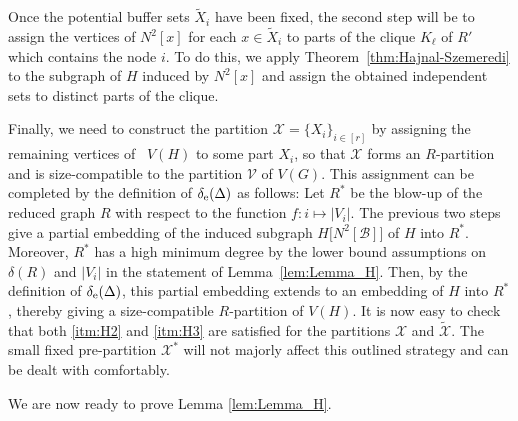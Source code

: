 \documentclass[final]{article}
\theoremstyle{definition}
\newcommand{\exth}{\delta_{\rm e}(\Delta)}
\let\tilde\widetilde
\begin{document}
Once the potential buffer sets $\tilde{X}_i$ have been fixed, the second step will be to assign the vertices of $N^2[x]$ for each $x \in \tilde{X}_i$ to parts of the clique $K_{\ell}$ of $R'$ which contains the node $i$. To do this, we apply Theorem~\ref{thm:Hajnal-Szemeredi} to the subgraph of $H$ induced by $N^2[x]$ and assign the obtained independent sets to distinct parts of the clique. 

Finally, we need to construct the partition $\mathcal{X} = \{X_i\}_{i\in [r]}$ by assigning the remaining vertices of~ $V(H)$ to some part $X_i$, so that $\mathcal{X}$ forms an $R$-partition and is size-compatible to the partition $\mathcal{V}$ of $V(G)$. This assignment can be completed by the definition of $\exth$ as follows: Let $R^*$ be the blow-up of the reduced graph $R$ with respect to the function $f: i \mapsto |V_i|$. The previous two steps give a partial embedding of the induced subgraph $H\bigl[N^2[\mathcal{B}]\bigr]$ of $H$ into $R^*$. Moreover, $R^*$ has a high minimum degree by the lower bound assumptions on $\delta(R)$ and $|V_i|$ in the statement of Lemma~\ref{lem:Lemma_H}. Then, by the definition of $\exth$, this partial embedding extends to an embedding of $H$ into $R^*$, thereby giving a size-compatible $R$-partition of $V(H)$. It is now easy to check that both \ref{itm:H2} and \ref{itm:H3} are satisfied for the partitions $\mathcal{X}$ and $\tilde{\mathcal{X}}$. The small fixed pre-partition $\mathcal{X}^*$ will not majorly affect this outlined strategy and can be dealt with comfortably. 

We are now ready to prove Lemma \ref{lem:Lemma_H}. 
\end{document}
